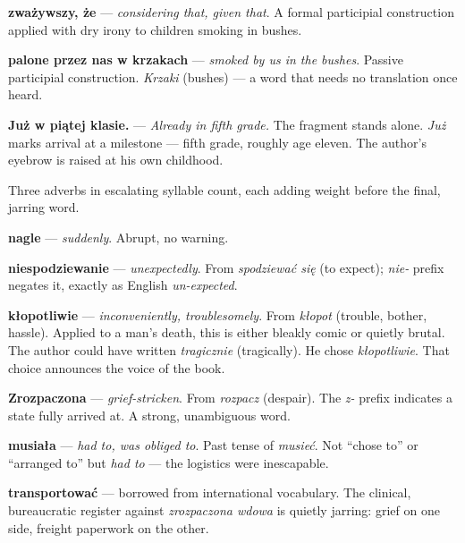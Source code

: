 \textbf{zważywszy, że} — \textit{considering that, given that}. A formal 
participial construction applied with dry irony to children smoking in bushes.

\textbf{palone przez nas w krzakach} — \textit{smoked by us in the bushes}. 
Passive participial construction. \textit{Krzaki} (bushes) — a word that 
needs no translation once heard.

\textbf{Już w piątej klasie.} — \textit{Already in fifth grade.} The fragment 
stands alone. \textit{Już} marks arrival at a milestone — fifth grade, roughly 
age eleven. The author's eyebrow is raised at his own childhood.



Three adverbs in escalating syllable count, each adding weight before 
the final, jarring word.

\textbf{nagle} — \textit{suddenly}. Abrupt, no warning.

\textbf{niespodziewanie} — \textit{unexpectedly}. From \textit{spodziewać się} 
(to expect); \textit{nie-} prefix negates it, exactly as English \textit{un-expected}.

\textbf{kłopotliwie} — \textit{inconveniently, troublesomely}. From 
\textit{kłopot} (trouble, bother, hassle). Applied to a man's death, 
this is either bleakly comic or quietly brutal. The author could have 
written \textit{tragicznie} (tragically). He chose \textit{kłopotliwie}. 
That choice announces the voice of the book.



\textbf{Zrozpaczona} — \textit{grief-stricken}. From \textit{rozpacz} (despair). 
The \textit{z-} prefix indicates a state fully arrived at. A strong, unambiguous word.

\textbf{musiała} — \textit{had to, was obliged to}. Past tense of \textit{musieć}. 
Not ``chose to'' or ``arranged to'' but \textit{had to} — the logistics were inescapable.

\textbf{transportować} — borrowed from international vocabulary. The clinical, 
bureaucratic register against \textit{zrozpaczona wdowa} is quietly jarring: 
grief on one side, freight paperwork on the other.

